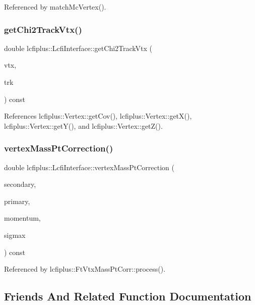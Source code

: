 Referenced by match\+Mc\+Vertex().

\mbox{\label{classlcfiplus_1_1LcfiInterface_aca23b132c18f5ef056d8bbaac43ae12f}} 
\subsubsection{get\+Chi2\+Track\+Vtx()}
{\footnotesize\ttfamily double lcfiplus\+::\+Lcfi\+Interface\+::get\+Chi2\+Track\+Vtx (\begin{DoxyParamCaption}\item[{const \textbf{ Vertex} $\ast$}]{vtx,  }\item[{const \textbf{ Track} $\ast$}]{trk }\end{DoxyParamCaption}) const}



References lcfiplus\+::\+Vertex\+::get\+Cov(), lcfiplus\+::\+Vertex\+::get\+X(), lcfiplus\+::\+Vertex\+::get\+Y(), and lcfiplus\+::\+Vertex\+::get\+Z().

\mbox{\label{classlcfiplus_1_1LcfiInterface_a04de5305926f7c4c9130c79cd2103f0f}} 
\subsubsection{vertex\+Mass\+Pt\+Correction()}
{\footnotesize\ttfamily double lcfiplus\+::\+Lcfi\+Interface\+::vertex\+Mass\+Pt\+Correction (\begin{DoxyParamCaption}\item[{const \textbf{ Vertex} $\ast$}]{secondary,  }\item[{const \textbf{ Vertex} $\ast$}]{primary,  }\item[{const T\+Vector3 \&}]{momentum,  }\item[{float}]{sigmax }\end{DoxyParamCaption}) const}



Referenced by lcfiplus\+::\+Ft\+Vtx\+Mass\+Pt\+Corr\+::process().



\subsection{Friends And Related Function Documentation}
\mbox{\label{classlcfiplus_1_1LcfiInterface_a996b32b4a9ba9ca9c1ff7035f5e123df}} 

